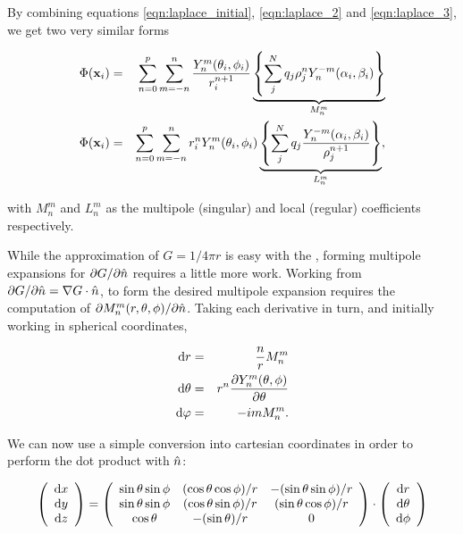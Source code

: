 By combining equations \ref{eqn:laplace_initial}, \ref{eqn:laplace_2} and \ref{eqn:laplace_3}, we get two very similar forms


\begin{eqnarray}
	\Phi(\mathbf{x}_i) & = & \sum_{n=0}^{p}\sum_{m=-n}^{n}\frac{Y^{m}_n(\theta_i,\phi_i)}{r_i^{n+1}}\underbrace{\left \{ \sum_j^{N}q_j\rho^{n}_jY^{-m}_n(\alpha_i,\beta_i)\right \} }_{M^{m}_n} \\
	\Phi(\mathbf{x}_i) & = & \sum_{n=0}^{p}\sum_{m=-n}^{n}r_i^{n}Y^{m}_n(\theta_i,\phi_i)\underbrace{\left \{ \sum_j^{N}q_j\frac{Y^{-m}_n(\alpha_i,\beta_i)}{\rho^{n+1}_j}\right \} }_{L^{m}_n},
\end{eqnarray}

\noindent
with $M^{m}_n$ and $L^{m}_n$ as the multipole (singular) and local (regular) coefficients respectively.

While the approximation of $G = 1/4\pi r$ is easy with the {\fmm}, forming multipole expansions for $\partial G / \partial \hat{n}$ requires a little more work. Working from $\partial G / \partial \hat{n} = \nabla G\cdot\hat{n}$, to form the desired multipole expansion requires the computation of $\partial M^{m}_n(r,\theta,\phi) / \partial \hat{n}$. Taking each derivative in turn, and initially working in spherical coordinates,

\begin{eqnarray}
	\text{d}r & = & \frac{n}{r}M^{m}_n \nonumber \\
	\text{d}\theta & = & r^{n}\frac{\partial Y^{m}_n(\theta,\phi)}{\partial \theta} \nonumber \\
	\text{d}\varphi & = & -imM^{m}_n. \nonumber
\end{eqnarray}

We can now use a simple conversion into cartesian coordinates in order to perform the dot product with $\hat{n}$:

\begin{equation*}
	\left(\begin{array}{c}
		\text{d}x \\
		\text{d}y \\
		\text{d}z
	\end{array}\right) = 
	\left(\begin{array}{ccc}
		\sin{\theta}\sin{\phi} & (\cos{\theta}\cos{\phi})/r & -(\sin{\theta}\sin{\phi})/r \\
		\sin{\theta}\sin{\phi} & (\cos{\theta}\sin{\phi})/r & (\sin{\theta}\cos{\phi})/r \\
		\cos{\theta} & -(\sin{\theta})/r & 0
	\end{array}\right) \cdot \left(\begin{array}{c}
		\text{d}r \\
		\text{d}\theta \\
		\text{d}\phi
	\end{array}\right)
\end{equation*}

